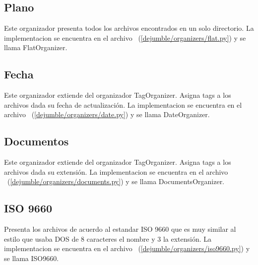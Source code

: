 \subsection{Plano}

Este organizador presenta todos los archivos encontrados en un solo directorio. La implementacion se encuentra en el archivo ~(\ref{dejumble/organizers/flat.py}) y se llama FlatOrganizer.

\subsection{Fecha}

Este organizador extiende del organizador TagOrganizer. Asigna tags a los archivos dada su fecha de actualización. La implementacion se encuentra en el archivo ~(\ref{dejumble/organizers/date.py}) y se llama DateOrganizer.

\subsection{Documentos}

Este organizador extiende del organizador TagOrganizer. Asigna tags a los archivos dada su extensión. La implementacion se encuentra en el archivo ~(\ref{dejumble/organizers/documents.py}) y se llama DocumentsOrganizer.

\subsection{ISO 9660}

Presenta los archivos de acuerdo al estandar ISO 9660 que es muy similar al estilo que usaba DOS de 8 caracteres el nombre y 3 la extensión. La implementacion se encuentra en el archivo ~(\ref{dejumble/organizers/iso9660.py}) y se llama ISO9660.


